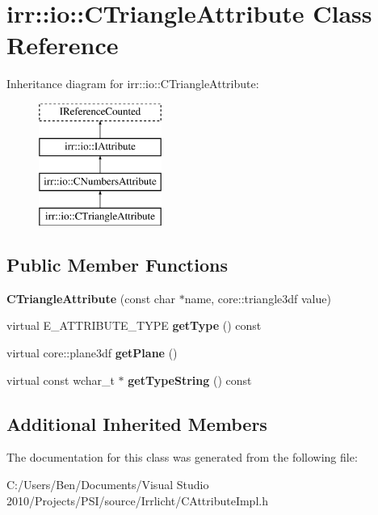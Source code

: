 \hypertarget{classirr_1_1io_1_1_c_triangle_attribute}{\section{irr\-:\-:io\-:\-:C\-Triangle\-Attribute Class Reference}
\label{classirr_1_1io_1_1_c_triangle_attribute}
}
Inheritance diagram for irr\-:\-:io\-:\-:C\-Triangle\-Attribute\-:\begin{figure}[H]
\begin{center}
\leavevmode
\includegraphics[height=4.000000cm]{classirr_1_1io_1_1_c_triangle_attribute}
\end{center}
\end{figure}
\subsection*{Public Member Functions}
\begin{DoxyCompactItemize}
\item 
\hypertarget{classirr_1_1io_1_1_c_triangle_attribute_a2fa22f7806f25f20b511d167b36b8a5d}{{\bfseries C\-Triangle\-Attribute} (const char $\ast$name, core\-::triangle3df value)}\label{classirr_1_1io_1_1_c_triangle_attribute_a2fa22f7806f25f20b511d167b36b8a5d}

\item 
\hypertarget{classirr_1_1io_1_1_c_triangle_attribute_a064cc6df347b435eb589266aa808b0c0}{virtual E\-\_\-\-A\-T\-T\-R\-I\-B\-U\-T\-E\-\_\-\-T\-Y\-P\-E {\bfseries get\-Type} () const }\label{classirr_1_1io_1_1_c_triangle_attribute_a064cc6df347b435eb589266aa808b0c0}

\item 
\hypertarget{classirr_1_1io_1_1_c_triangle_attribute_ae9d28d4c71f3b57d77dfd37d9ed8f777}{virtual core\-::plane3df {\bfseries get\-Plane} ()}\label{classirr_1_1io_1_1_c_triangle_attribute_ae9d28d4c71f3b57d77dfd37d9ed8f777}

\item 
\hypertarget{classirr_1_1io_1_1_c_triangle_attribute_aabdb94d28fa10a2fb60646eb34a1680e}{virtual const wchar\-\_\-t $\ast$ {\bfseries get\-Type\-String} () const }\label{classirr_1_1io_1_1_c_triangle_attribute_aabdb94d28fa10a2fb60646eb34a1680e}

\end{DoxyCompactItemize}
\subsection*{Additional Inherited Members}


The documentation for this class was generated from the following file\-:\begin{DoxyCompactItemize}
\item 
C\-:/\-Users/\-Ben/\-Documents/\-Visual Studio 2010/\-Projects/\-P\-S\-I/source/\-Irrlicht/C\-Attribute\-Impl.\-h\end{DoxyCompactItemize}

